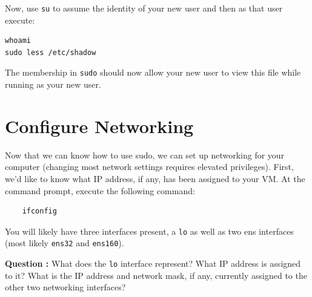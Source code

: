 \documentclass{article}
\begin{document}
Now, use {\tt su} to assume the identity of your new user and then as that user execute:
\begin{verbatim}
whoami
sudo less /etc/shadow
\end{verbatim}

The membership in {\tt sudo} should now allow your new user to view this file while running as your new user. 

\section{Configure Networking}

Now that we can know how to use sudo, we can set up networking for your computer (changing most network settings requires elevated privileges). First, we'd like to know what IP address, if any, has been assigned to your VM. At the command prompt, execute the following command:
\begin{verbatim}
	ifconfig 
\end{verbatim}

You will likely have three interfaces present, a {\tt lo} as well as two ens interfaces (most likely {\tt ens32} and {\tt ens160}). \medskip

\textbf{Question :} What does the {\tt lo} interface represent? What IP address is assigned to it? What is the IP address and network mask, if any, currently assigned to the other two networking interfaces?\medskip
\addtocounter{Question}{1}
\end{document}
